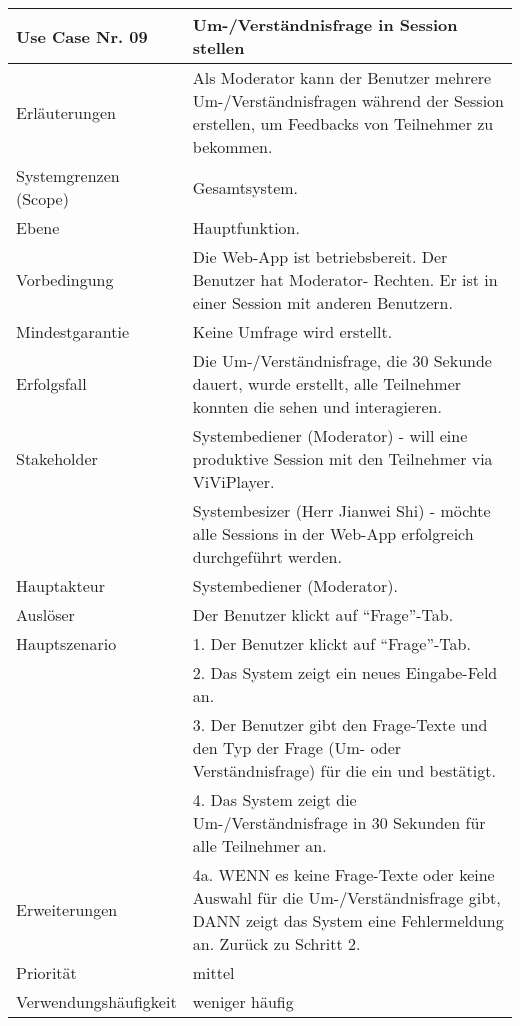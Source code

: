 \begin{tabularx}{\linewidth}{|l|X|}
	\hline
	Use Case Nr. 09			& \textbf{Um-/Verständnisfrage in Session stellen} \\ \hline
	Erläuterungen			& Als Moderator kann der Benutzer mehrere Um-/Verständnisfragen 
							  während der Session erstellen, um Feedbacks von Teilnehmer zu bekommen. \\ \hline
	Systemgrenzen (Scope)	& Gesamtsystem. \\ \hline
	Ebene					& Hauptfunktion. \\ \hline
	Vorbedingung			& Die Web-App ist betriebsbereit. Der Benutzer hat Moderator-
							  Rechten. Er ist in einer Session mit anderen Benutzern. \\ \hline
	Mindestgarantie			& Keine Umfrage wird erstellt. \\ \hline
	Erfolgsfall 			& Die Um-/Verständnisfrage, die 30 Sekunde dauert, wurde erstellt, 
							  alle Teilnehmer konnten die sehen und interagieren. \\ \hline
	Stakeholder				& Systembediener (Moderator) - will eine produktive Session mit den 
							  Teilnehmer via ViViPlayer. \\
							& Systembesizer (Herr Jianwei Shi) - möchte alle Sessions in der 
							  Web-App erfolgreich durchgeführt werden. \\ \hline
	Hauptakteur				& Systembediener (Moderator). \\ \hline
	Auslöser				& Der Benutzer klickt auf ``Frage''-Tab. \\ \hline	
	Hauptszenario			& 1. Der Benutzer klickt auf ``Frage''-Tab. \\
							& 2. Das System zeigt ein neues Eingabe-Feld an. \\ 
							& 3. Der Benutzer gibt den Frage-Texte und den Typ der Frage (Um- 
							  oder Verständnisfrage) für die ein und bestätigt. \\
							& 4. Das System zeigt die Um-/Verständnisfrage in 30 Sekunden für 
							  alle Teilnehmer an. \\ \hline
	Erweiterungen			& 4a. WENN es keine Frage-Texte oder keine Auswahl für die 
							  Um-/Verständnisfrage gibt, DANN zeigt das System eine Fehlermeldung an. Zurück zu Schritt 2. \\ \hline
	Priorität				& mittel \\ \hline
	Verwendungshäufigkeit	& weniger häufig \\ \hline
\end{tabularx}